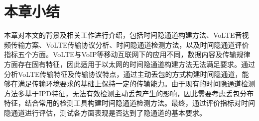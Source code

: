 \section{本章小结}
\label{chap:backinfo:summary}

本章对本文的背景及相关工作进行介绍，包括时间隐通道构建方法、VoLTE音视频传输方案、VoLTE传输协议分析、时间隐通道检测方法，以及时间隐通道评价指标五个方面。VoLTE与VoIP等移动互联网下的应用不同，数据内容及传输规律方面存在固有特征，因此适用于以太网的时间隐通道构建方法无法满足要求。通过分析VoLTE传输特征及传输协议特点，通过主动丢包的方式构建时间隐通道，能够在满足传输环境要求的基础上保持一定的传输能力。由于现有的时间隐通道检测方法多基于IPD特征，无法有效检测主动丢包产生的影响，因此需要考虑丢包分布特征，结合常用的检测工具构建时间隐通道检测方法。最终，通过评价指标对时间隐通道进行评估，测试各方面表现是否达到了隐通道的基本要求。